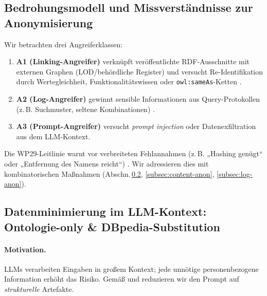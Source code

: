 \subsection{Bedrohungsmodell und Missverständnisse zur Anonymisierung}
\label{subsec:threat-model}

Wir betrachten drei Angreiferklassen:

\begin{enumerate}
  \item \textbf{A1 (Linking-Angreifer)} verknüpft veröffentlichte RDF-Ausschnitte mit externen Graphen (LOD/behördliche Register) und versucht Re-Identifikation durch Wertegleichheit, Funktionalitätswissen oder \texttt{owl:sameAs}-Ketten \cite{delanaux_rdf_graph_anonymization_linkage,cuenca_kostylev_logical_foundations_ppdp_ld}.
  \item \textbf{A2 (Log-Angreifer)} gewinnt sensible Informationen aus Query-Protokollen (z.\,B. Suchmuster, seltene Kombinationen) \cite{goetz2012publishing_search_logs,navarro_arribas2012_user_kanon_querylogs,adar2007user4xxxxx9}.
  \item \textbf{A3 (Prompt-Angreifer)} versucht \emph{prompt injection} oder Datenexfiltration aus dem LLM-Kontext.
\end{enumerate}

Die WP29-Leitlinie warnt vor verbreiteten Fehlannahmen (z.\,B. „Hashing genügt“ oder „Entfernung des Namens reicht“) \cite{wp29_anonymisation_2014}. Wir adressieren dies mit kombinatorischen Maßnahmen (Abschn.\,\ref{subsec:llm-context-min}, \ref{subsec:content-anon}, \ref{subsec:log-anon}).

\subsection{Datenminimierung im LLM-Kontext: Ontologie-only \& DBpedia-Substitution}
\label{subsec:llm-context-min}

\paragraph{Motivation.}
LLMs verarbeiten Eingaben in großem Kontext; jede unnötige personenbezogene Information erhöht das Risiko. Gemäß \cite{w3c_privacy_principles,w3c_dwbp_2017} und \cite{kirrane2018access_control_rdf_survey} reduzieren wir den Prompt auf \emph{strukturelle} Artefakte.

